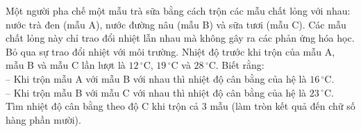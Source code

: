	\begin{ex}%
		Một người pha chế một mẫu trà sữa bằng cách trộn các mẫu chất lỏng với nhau: nước trà đen (mẫu A), nước đường nâu (mẫu B) và sữa tươi (mẫu C). Các mẫu chất lỏng này chỉ trao đổi nhiệt lẫn nhau mà không gây ra các phản ứng hóa học. Bỏ qua sự trao đổi nhiệt với môi trường. Nhiệt độ trước khi trộn của mẫu A, mẫu B và mẫu C lần lượt là $12\,^\circ\text{C}$, $19\,^\circ\text{C}$ và $28\,^\circ\text{C}$. Biết rằng:\\
		-- Khi trộn mẫu A với mẫu B với nhau thì nhiệt độ cân bằng của hệ là $16\,^\circ\text{C}$.\\
		-- Khi trộn mẫu B với mẫu C với nhau thì nhiệt độ cân bằng của hệ là $23\,^\circ\text{C}$.\\
		Tìm nhiệt độ cân bằng theo độ C khi trộn cả 3 mẫu (làm tròn kết quả đến chữ số hàng phần mười).
		\par
	\end{ex}

